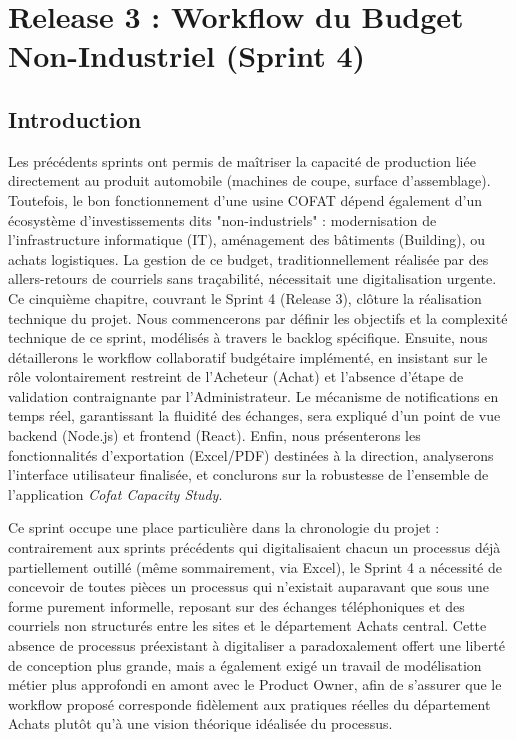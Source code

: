 \chapter{Release 3 : Workflow du Budget Non-Industriel (Sprint 4)}
\label{chap:sprint_4}

\section{Introduction}
Les précédents sprints ont permis de maîtriser la capacité de production liée directement au produit automobile (machines de coupe, surface d'assemblage). Toutefois, le bon fonctionnement d'une usine COFAT dépend également d'un écosystème d'investissements dits "non-industriels" : modernisation de l'infrastructure informatique (IT), aménagement des bâtiments (Building), ou achats logistiques. La gestion de ce budget, traditionnellement réalisée par des allers-retours de courriels sans traçabilité, nécessitait une digitalisation urgente. Ce cinquième chapitre, couvrant le Sprint 4 (Release 3), clôture la réalisation technique du projet. Nous commencerons par définir les objectifs et la complexité technique de ce sprint, modélisés à travers le backlog spécifique. Ensuite, nous détaillerons le workflow collaboratif budgétaire implémenté, en insistant sur le rôle volontairement restreint de l'Acheteur (Achat) et l'absence d'étape de validation contraignante par l'Administrateur. Le mécanisme de notifications en temps réel, garantissant la fluidité des échanges, sera expliqué d'un point de vue backend (Node.js) et frontend (React). Enfin, nous présenterons les fonctionnalités d'exportation (Excel/PDF) destinées à la direction, analyserons l'interface utilisateur finalisée, et conclurons sur la robustesse de l'ensemble de l'application \textit{Cofat Capacity Study}.

Ce sprint occupe une place particulière dans la chronologie du projet : contrairement aux sprints précédents qui digitalisaient chacun un processus déjà partiellement outillé (même sommairement, via Excel), le Sprint 4 a nécessité de concevoir de toutes pièces un processus qui n'existait auparavant que sous une forme purement informelle, reposant sur des échanges téléphoniques et des courriels non structurés entre les sites et le département Achats central. Cette absence de processus préexistant à digitaliser a paradoxalement offert une liberté de conception plus grande, mais a également exigé un travail de modélisation métier plus approfondi en amont avec le Product Owner, afin de s'assurer que le workflow proposé corresponde fidèlement aux pratiques réelles du département Achats plutôt qu'à une vision théorique idéalisée du processus.

